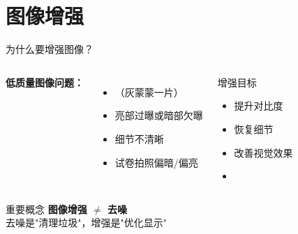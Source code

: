 
\section{图像增强}

\begin{frame}{为什么要增强图像？}
    \begin{columns}
        \textbf{低质量图像问题：}
        \begin{itemize}
            \item {}（灰蒙蒙一片）
            \item 亮部过曝或暗部欠曝
            \item 细节不清晰
            \item 试卷拍照偏暗/偏亮
        \end{itemize}

        \begin{alertblock}{增强目标}
            \begin{itemize}
                \item 提升对比度
                \item 恢复细节
                \item 改善视觉效果
                \item {}
            \end{itemize}
        \end{alertblock}
    \end{columns}

    \vspace{0.5cm}
    \begin{block}{重要概念}
        \textbf{图像增强 $\neq$ 去噪} \\
        去噪是"清理垃圾"，增强是"优化显示"
    \end{block}
\end{frame}

